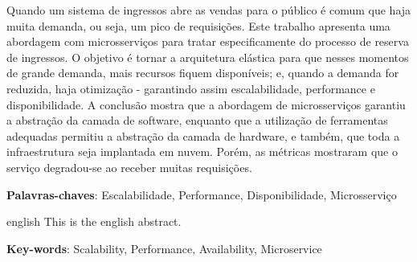 \setlength{\absparsep}{18pt} %
\begin{resumo}


  Quando um sistema de ingressos abre as vendas para o público é comum
  que haja muita demanda, ou seja, um pico de requisições.
  Este trabalho apresenta uma abordagem com microsserviços para tratar
  especificamente do processo de reserva de ingressos.
  O objetivo é tornar a arquitetura elástica para que nesses momentos
  de grande demanda, mais recursos fiquem disponíveis;
  e, quando a demanda for reduzida, haja otimização -
  garantindo assim escalabilidade, performance e disponibilidade.
  A conclusão mostra que a abordagem de microsserviços garantiu a
  abstração da camada de software, enquanto que a utilização de
  ferramentas adequadas permitiu a abstração da camada de hardware,
  e também, que toda a infraestrutura seja implantada em nuvem.
  Porém, as métricas mostraram que o serviço degradou-se ao receber muitas requisições.

  \textbf{Palavras-chaves}: Escalabilidade, Performance, Disponibilidade, Microsserviço


\end{resumo}

\begin{resumo}[Abstract]
 \begin{otherlanguage*}{english}
   This is the english abstract.

   \vspace{\onelineskip}

   \noindent
   \textbf{Key-words}: Scalability, Performance, Availability, Microservice
 \end{otherlanguage*}
\end{resumo}
